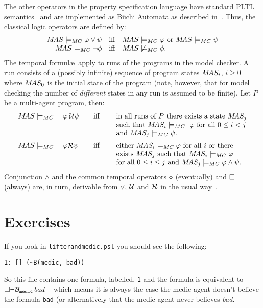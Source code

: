 \documentclass[a4]{article}
\begin{document}
\noindent The other operators in the \ajpf{} property specification
language have standard PLTL semantics~\cite{emerson:90a} and are
implemented as B\"{u}chi Automata as described
in~\cite{Gerth:1995:SOA:645837.670574,Courcoubetis92mea}. Thus, the
classical logic operators are defined by:
$$
\begin{array}{rcl}
  M\!AS \models_{MC} \varphi \vee \psi &\text{iff}& M\!AS \models_{MC}
  \varphi \text{ or } M\!AS \models_{MC} \psi \\
  M\!AS \models_{MC} \neg \phi &\text{iff}& M\!AS \not\models_{MC} \phi.
\end{array}
$$
The temporal formul\ae\ apply to runs of the programs in the \jpf{}
model checker. A run consists of a (possibly infinite) sequence of
program states $M\!AS_i$, $i \geq 0$ where $M\!AS_0$ is the initial
state of the program (note, however, that for model checking the
number of \emph{different} states in any run is assumed to be
finite). Let $P$ be a multi-agent program, then:
$$
\begin{array}{lcl}
  \MAS \models_{MC}\quad \varphi \: \until \psi 
   &\quad\text{iff}\quad&
    \text{ in all runs of $P$ there exists a state } \MAS_j\\
  &&  \text{ such that } \MAS_i \models_{MC}\ \varphi \text{ for all } 0 \leq i < j \\
  && \text{ and } \MAS_j \models_{MC} \psi{}.\\[.5em]
%
  \MAS \models_{MC}\quad\varphi \release \psi  
   &\quad\text{iff}\quad&
    \text{ either } \MAS_i \models_{MC} \varphi \text{ for all } i \text{ or there }\\
  && \text{ exists } \MAS_j \text{ such  that } \MAS_i \models_{MC} \varphi\\
  && \text{ for all } 0 \leq i \leq j \text{ and } \MAS_j \models_{MC} \varphi \land \psi{}.
\end{array}
$$
%
Conjunction $\land$ and the common temporal operators $\diamond$ (eventually) and $\Box$
(always) are, in turn, derivable from $\vee$, $\mathcal{U}$ and $\mathcal{R}$ in the
usual way~\cite{emerson:90a}.

\section{Exercises}
If you look in \texttt{lifterandmedic.psl} you should see the following:
\begin{verbatim}
1: [] (~B(medic, bad))
\end{verbatim}
So this file contains one formula, labelled, \texttt{1} and the formula is equivalent to $\Box \neg \mathrm{{\cal B}}_{\texttt{medic}} \, bad$ -- which means it is always the case the medic agent doesn't believe the formula \texttt{bad} (or alternatively that the medic agent never believes \emph{bad}.
\end{document}

